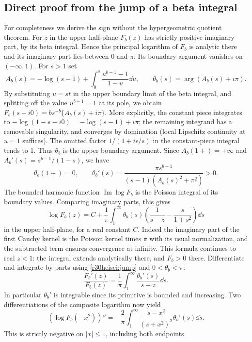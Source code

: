 \documentclass[11pt,a4paper]{article}
\numberwithin{equation}{section}
\theoremstyle{definition}
\theoremstyle{remark}
\begin{document}
\subsection{Direct proof from the jump of a beta integral}
For completeness we derive the sign without the hypergeometric quotient
theorem. For $z$ in the upper half-plane $F_b(z)$ has strictly positive
imaginary part, by its beta integral. Hence the principal logarithm of
$F_b$ is analytic there and its imaginary part lies between $0$ and $\pi$.
Its boundary argument vanishes on $(-\infty,1)$. For $s>1$ set
\[
 A_b(s)= -\log(s-1)+
                \int_0^s\frac{u^{b-1}-1}{1-u}\dd u,\qquad
 \theta_b(s)=\arg(A_b(s)+i\pi).
\]
By substituting $u=st$ in the upper boundary limit of the beta integral,
and splitting off the value $u^{b-1}=1$ at its pole, we obtain
$F_b(s+i0)=b s^{-b}\{A_b(s)+i\pi\}$. More explicitly, the constant
piece integrates to $-\log(1-s-i0)=-\log(s-1)+i\pi$; the remaining
integrand has a removable singularity, and converges by domination
(local Lipschitz continuity at $u=1$ suffices).
The omitted factor $1/(1+i\epsilon/s)$ in the constant-piece integral
tends to $1$. Thus $\theta_b$ is the upper boundary argument.
Since $A_b(1+)=+\infty$ and $A_b'(s)=s^{b-1}/(1-s)$, we have
\begin{equation}\label{r30heisei:jump}
 \theta_b(1+)=0,\qquad
 \theta_b'(s)=\frac{\pi s^{b-1}}{(s-1)(A_b(s)^2+\pi^2)}>0 .
\end{equation}
The bounded harmonic function $\operatorname{Im}\log F_b$ is the Poisson
integral of its boundary values. Comparing imaginary parts, this gives
\[
 \log F_b(z)=C+\frac1\pi\int_1^\infty\theta_b(s)
       \left(\frac{1}{s-z}-\frac{s}{1+s^2}\right)\dd s
\]
in the upper half-plane, for a real constant $C$. Indeed the imaginary part
of the first Cauchy kernel is the Poisson kernel times $\pi$ with its usual
normalization, and the subtracted term ensures convergence at infinity.
This formula continues to real $z<1$: the integral extends analytically
there, and $F_b>0$ there. Differentiate and integrate by parts using
\eqref{r30heisei:jump} and $0<\theta_b<\pi$:
\[
 \frac{F_b'(z)}{F_b(z)}=\frac1\pi\int_1^\infty
                      \frac{\theta_b'(s)}{s-z}\dd s .
\]
In particular $\theta_b'$ is integrable since its primitive is bounded
and increasing. Two differentiations of the composite logarithm now yield
\[
 (\log F_b(-x^2))''=-\frac2\pi\int_1^\infty
         \frac{s-x^2}{(s+x^2)^2}\theta_b'(s)\dd s.
\]
This is strictly negative on $|x|\le1$, including both endpoints.
\end{document}
